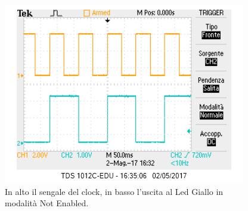 \documentclass[10pt,a4paper]{article}
\begin{document}
\begin{figure}
\centering
\includegraphics[scale=0.7]{ch1clock-ch2giallolamp.png}
\caption{In alto il sengale del clock, in basso l'uscita al Led Giallo in modalità Not Enabled.\label{fig:lampeggiante}}
\end{figure} 

\end{document}
